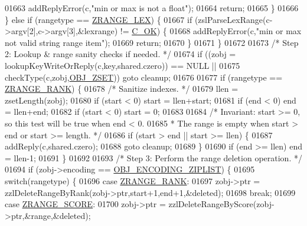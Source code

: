 \begin{DoxyCode}
01663             addReplyError(c,\textcolor{stringliteral}{"min or max is not a float"});
01664             \textcolor{keywordflow}{return};
01665         \}
01666     \} \textcolor{keywordflow}{else} \textcolor{keywordflow}{if} (rangetype == \hyperlink{t__zset_8c_a74c64b6c3895c27dc16c15a3c4c590af}{ZRANGE\_LEX}) \{
01667         \textcolor{keywordflow}{if} (zslParseLexRange(c->argv[2],c->argv[3],&lexrange) != \hyperlink{server_8h_a303769ef1065076e68731584e758d3e1}{C\_OK}) \{
01668             addReplyError(c,\textcolor{stringliteral}{"min or max not valid string range item"});
01669             \textcolor{keywordflow}{return};
01670         \}
01671     \}
01672 
01673     \textcolor{comment}{/* Step 2: Lookup & range sanity checks if needed. */}
01674     \textcolor{keywordflow}{if} ((zobj = lookupKeyWriteOrReply(c,key,shared.czero)) == NULL ||
01675         checkType(c,zobj,\hyperlink{server_8h_a8c356422ddbc03bd77694880a30a1953}{OBJ\_ZSET})) \textcolor{keywordflow}{goto} cleanup;
01676 
01677     \textcolor{keywordflow}{if} (rangetype == \hyperlink{t__zset_8c_a5efcb596b1e5f49647431b38c2c5dde3}{ZRANGE\_RANK}) \{
01678         \textcolor{comment}{/* Sanitize indexes. */}
01679         llen = zsetLength(zobj);
01680         \textcolor{keywordflow}{if} (start < 0) start = llen+start;
01681         \textcolor{keywordflow}{if} (end < 0) end = llen+end;
01682         \textcolor{keywordflow}{if} (start < 0) start = 0;
01683 
01684         \textcolor{comment}{/* Invariant: start >= 0, so this test will be true when end < 0.}
01685 \textcolor{comment}{         * The range is empty when start > end or start >= length. */}
01686         \textcolor{keywordflow}{if} (start > end || start >= llen) \{
01687             addReply(c,shared.czero);
01688             \textcolor{keywordflow}{goto} cleanup;
01689         \}
01690         \textcolor{keywordflow}{if} (end >= llen) end = llen-1;
01691     \}
01692 
01693     \textcolor{comment}{/* Step 3: Perform the range deletion operation. */}
01694     \textcolor{keywordflow}{if} (zobj->encoding == \hyperlink{server_8h_aabf064ede983103f1fd0df2086e84eee}{OBJ\_ENCODING\_ZIPLIST}) \{
01695         \textcolor{keywordflow}{switch}(rangetype) \{
01696         \textcolor{keywordflow}{case} \hyperlink{t__zset_8c_a5efcb596b1e5f49647431b38c2c5dde3}{ZRANGE\_RANK}:
01697             zobj->ptr = zzlDeleteRangeByRank(zobj->ptr,start+1,end+1,&deleted);
01698             \textcolor{keywordflow}{break};
01699         \textcolor{keywordflow}{case} \hyperlink{t__zset_8c_a0ca38ddc10a38a3b5f6b50e2b25fc4ce}{ZRANGE\_SCORE}:
01700             zobj->ptr = zzlDeleteRangeByScore(zobj->ptr,&range,&deleted);

\end{DoxyCode}
